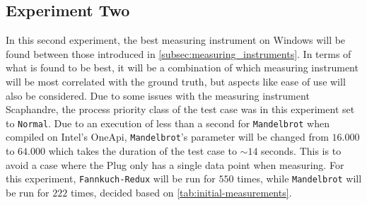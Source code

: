\subsection{Experiment Two}\label{subsec:exp_two}

In this second experiment, the best measuring instrument on Windows will be found between those introduced in \cref{subsec:measuring_instruments}. In terms of what is found to be best, it will be a combination of which measuring instrument will be most correlated with the ground truth, but aspects like ease of use will also be considered. Due to some issues with the measuring instrument Scaphandre, the process priority class of the test case was in this experiment set to \texttt{Normal}. Due to an execution of less than a second for \texttt{Mandelbrot} when compiled on Intel's OneApi, \texttt{Mandelbrot}'s parameter will be changed from $16.000$ to $64.000$ which takes the duration of the test case to $\sim 14$ seconds. This is to avoid a case where the Plug only has a single data point when measuring. For this experiment, \texttt{Fannkuch-Redux} will be run for $550$ times, while \texttt{Mandelbrot} will be run for $222$ times, decided based on \cref{tab:initial-measurements}.





